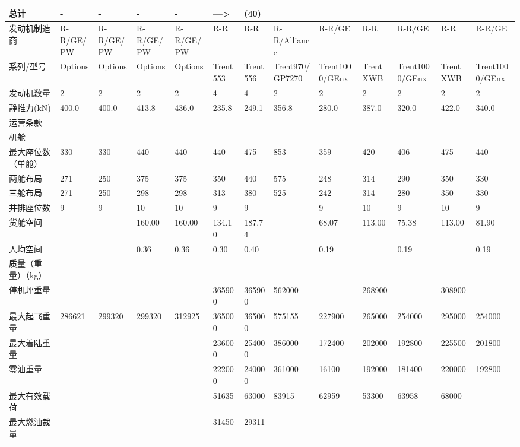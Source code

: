 \documentclass[12pt,a4paper]{report}
\begin{document}
\begin{landscape}
\begin{center}
\begin{longtable}{|p{1.5cm}|p{1.3cm}|p{1.1cm}|p{1.1cm}|p{1.1cm}|p{1.1cm}|p{1.1cm}|p{1.1cm}|p{1.1cm}|p{1.1cm}|p{1.1cm}|p{1.1cm}|p{1.1cm}|}
总计	&	-	&	-	&	-	&	-	&	--->	&	(40)	&		&		&		&		&		&		\\ \hline
发动机制造商	&	R-R/GE/PW	&	R-R/GE/PW	&	R-R/GE/PW	&	R-R/GE/PW	&	R-R	&	R-R	&	R-R/Alliance	&	R-R/GE	&	R-R	&	R-R/GE	&	R-R	&	R-R/GE	\\ \hline
系列/型号	&	Options	&	Options	&	Options	&	Options	&	Trent 553	&	Trent 556	&	Trent970/GP7270	&	Trent1000/GEnx	&	Trent XWB	&	Trent1000/GEnx	&	Trent XWB	&	Trent1000/GEnx	\\ \hline
发动机数量	&	2	&	2	&	2	&	2	&	4	&	4	&	2	&	2	&	2	&	2	&	2	&	2	\\ \hline
静推力(kN)	&	400.0	&	400.0	&	413.8	&	436.0	&	235.8	&	249.1	&	356.8	&	280.0	&	387.0	&	320.0	&	422.0	&	340.0	\\ \hline
运营条款	&		&		&		&		&		&		&		&		&		&		&		&		\\ \hline
机舱	&		&		&		&		&		&		&		&		&		&		&		&		\\ \hline
最大座位数（单舱）	&	330	&	330	&	440	&	440	&	440	&	475	&	853	&	359	&	420	&	406	&	475	&	440	\\ \hline
两舱布局	&	271	&	250	&	375	&	375	&	350	&	440	&	575	&	248	&	314	&	290	&	350	&	330	\\ \hline
三舱布局	&	271	&	250	&	298	&	298	&	313	&	380	&	525	&	242	&	314	&	280	&	350	&	330	\\ \hline
并排座位数	&	9	&	9	&	10	&	10	&	9	&	9	&		&	9	&	10	&	9	&	10	&	9	\\ \hline
货舱空间	&		&		&	160.00	&	160.00	&	134.10	&	187.74	&		&	68.07	&	113.00	&	75.38	&	113.00	&	81.90	\\ \hline
人均空间	&		&		&	0.36	&	0.36	&	0.30	&	0.40	&		&	0.19	&		&	0.19	&		&	0.19	\\ \hline
质量（重量）（kg）	&		&		&		&		&		&		&		&		&		&		&		&		\\ \hline
停机坪重量	&		&		&		&		&	365900	&	365900	&	562000	&		&	268900	&		&	308900	&		\\ \hline
最大起飞重量	&	286621	&	299320	&	299320	&	312925	&	365000	&	365000	&	575155	&	227900	&	265000	&	254000	&	295000	&	254000	\\ \hline
最大着陆重量	&		&		&		&		&	236000	&	254000	&	386000	&	172400	&	202000	&	192800	&	225500	&	201800	\\ \hline
零油重量	&		&		&		&		&	222000	&	240000	&	361000	&	16100	&	192000	&	181400	&	220000	&	192800	\\ \hline
最大有效载荷	&		&		&		&		&	51635	&	63000	&	83915	&	62959	&	53300	&	63958	&	68000	&		\\ \hline
最大燃油裁量	&		&		&		&		&	31450	&	29311	&		&		&		&		&		&		\\ \hline

\end{longtable}
\end{center}
\end{landscape}
\end{document}
